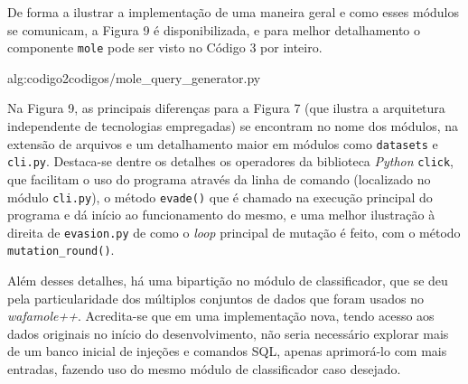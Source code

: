 De forma a ilustrar a implementação de uma maneira geral e como esses módulos se comunicam, a Figura 9 é disponibilizada, e para melhor detalhamento o componente \verb+mole+ pode ser visto no Código 3 por inteiro.

\label{sec:codigos}
 {alg:codigo2}{codigos/mole_query_generator.py}
\bigskip

Na Figura 9, as principais diferenças para a Figura 7 (que ilustra a arquitetura independente de tecnologias empregadas) se encontram no nome dos módulos, na extensão de arquivos e um detalhamento maior em módulos como \verb+datasets+ e \verb+cli.py+. Destaca-se dentre os detalhes os operadores da biblioteca \textit{Python} \verb+click+, que facilitam o uso do programa através da linha de comando (localizado no módulo \verb+cli.py+), o método \verb+evade()+ que é chamado na execução principal do programa e dá início ao funcionamento do mesmo, e uma melhor ilustração à direita de \verb+evasion.py+ de como o \textit{loop} principal de mutação é feito, com o método \verb+mutation_round()+.

Além desses detalhes, há uma bipartição no módulo de classificador, que se deu pela particularidade dos múltiplos conjuntos de dados que foram usados no \textit{wafamole++}. Acredita-se que em uma implementação nova, tendo acesso aos dados originais no início do desenvolvimento, não seria necessário explorar mais de um banco inicial de injeções e comandos SQL, apenas aprimorá-lo com mais entradas, fazendo uso do mesmo módulo de classificador caso desejado.


